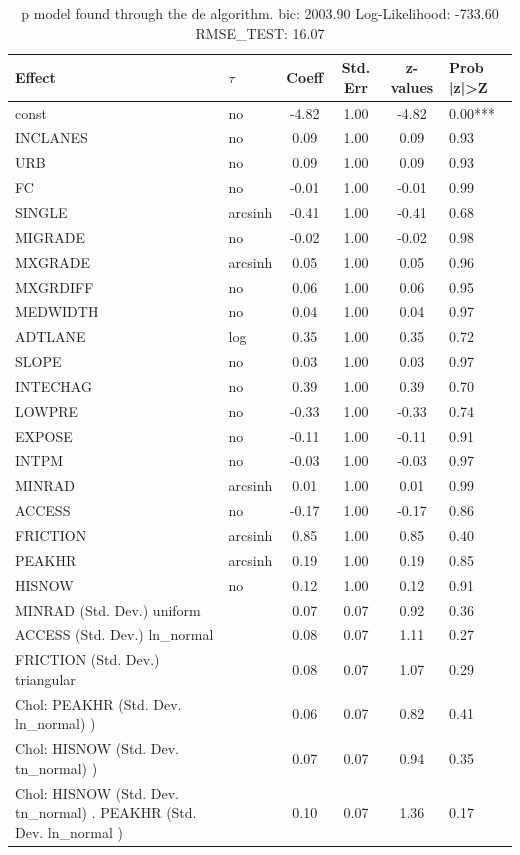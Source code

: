 \begin{table}
	\caption{p model found through the de algorithm. bic: 2003.90 Log-Likelihood: -733.60 RMSE_TEST: 16.07}
	\begin{center}
		\begin{tabular}{|l|l|c|c|c|l|}
			\hline
			Effect & $\tau$ & Coeff & Std. Err & z-values & Prob |z|>Z \\
			\hline
			const & no & -4.82 & 1.00 & -4.82 & 0.00*** \\
			\hline
			INCLANES & no & 0.09 & 1.00 & 0.09 & 0.93 \\
			\hline
			URB & no & 0.09 & 1.00 & 0.09 & 0.93 \\
			\hline
			FC & no & -0.01 & 1.00 & -0.01 & 0.99 \\
			\hline
			SINGLE & arcsinh & -0.41 & 1.00 & -0.41 & 0.68 \\
			\hline
			MIGRADE & no & -0.02 & 1.00 & -0.02 & 0.98 \\
			\hline
			MXGRADE & arcsinh & 0.05 & 1.00 & 0.05 & 0.96 \\
			\hline
			MXGRDIFF & no & 0.06 & 1.00 & 0.06 & 0.95 \\
			\hline
			MEDWIDTH & no & 0.04 & 1.00 & 0.04 & 0.97 \\
			\hline
			ADTLANE & log & 0.35 & 1.00 & 0.35 & 0.72 \\
			\hline
			SLOPE & no & 0.03 & 1.00 & 0.03 & 0.97 \\
			\hline
			INTECHAG & no & 0.39 & 1.00 & 0.39 & 0.70 \\
			\hline
			LOWPRE & no & -0.33 & 1.00 & -0.33 & 0.74 \\
			\hline
			EXPOSE & no & -0.11 & 1.00 & -0.11 & 0.91 \\
			\hline
			INTPM & no & -0.03 & 1.00 & -0.03 & 0.97 \\
			\hline
			MINRAD & arcsinh & 0.01 & 1.00 & 0.01 & 0.99 \\
			\hline
			ACCESS & no & -0.17 & 1.00 & -0.17 & 0.86 \\
			\hline
			FRICTION & arcsinh & 0.85 & 1.00 & 0.85 & 0.40 \\
			\hline
			PEAKHR & arcsinh & 0.19 & 1.00 & 0.19 & 0.85 \\
			\hline
			HISNOW & no & 0.12 & 1.00 & 0.12 & 0.91 \\
			\hline
			MINRAD (Std. Dev.) uniform &  & 0.07 & 0.07 & 0.92 & 0.36 \\
			\hline
			ACCESS (Std. Dev.) ln_normal &  & 0.08 & 0.07 & 1.11 & 0.27 \\
			\hline
			FRICTION (Std. Dev.) triangular &  & 0.08 & 0.07 & 1.07 & 0.29 \\
			\hline
			 Chol: PEAKHR (Std. Dev. ln_normal) ) &  & 0.06 & 0.07 & 0.82 & 0.41 \\
			\hline
			 Chol: HISNOW (Std. Dev. tn_normal) ) &  & 0.07 & 0.07 & 0.94 & 0.35 \\
			\hline
			 Chol: HISNOW (Std. Dev. tn_normal) . PEAKHR (Std. Dev.   ln_normal ) &  & 0.10 & 0.07 & 1.36 & 0.17 \\
			\hline
		\end{tabular}
	\end{center}
\end{table}